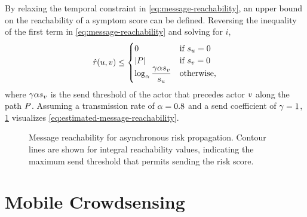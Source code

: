 By relaxing the temporal constraint in \cref{eq:message-reachability}, an upper bound on the reachability of a symptom score can be defined. Reversing the inequality of the first term in \cref{eq:message-reachability} and solving for $i$,
\begin{equation}\label{eq:estimated-message-reachability}
  \hat{r}(u, v) \leq \begin{cases} 
      0 & \text{if $s_u = 0$} \\
      \left\vert P \right\vert & \text{if $s_v = 0$} \\
      \log_\alpha \dfrac{\gamma \alpha s_v}{s_u} & \text{otherwise,}
    \end{cases}
\end{equation}
where $\gamma \alpha s_v$ is the send threshold of the actor that precedes actor $v$ along the path $P$. Assuming a transmission rate of $\alpha = 0.8$ and a send coefficient of $\gamma = 1$, \cref{fig:reach} visualizes \cref{eq:estimated-message-reachability}.

\begin{figure}[htbp]
\centering
{}
\caption[Message reachability for asynchronous risk propagation]{Message reachability for asynchronous risk propagation. Contour lines are shown for integral reachability values, indicating the maximum send threshold that permits sending the risk score.}
\label{fig:reach}
\end{figure}

\section{Mobile Crowdsensing}

